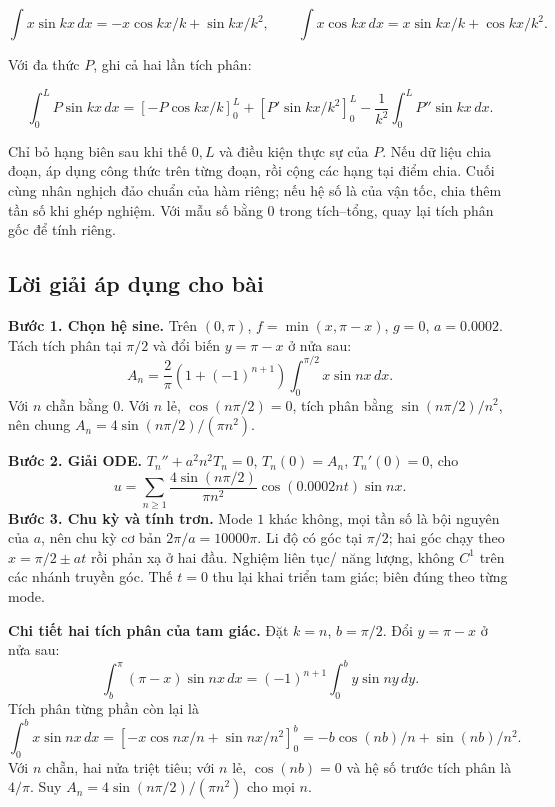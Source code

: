 \documentclass[10pt,a4paper]{article}
\begin{document}
\[
\int x\sin kx\,dx=-x\cos kx/k+\sin kx/k^2,\qquad
\int x\cos kx\,dx=x\sin kx/k+\cos kx/k^2.
\]


Với đa thức $P$, ghi cả hai lần tích phân:


\[
\int_0^L P\sin kx\,dx
=\left[-P\cos kx/k\right]_0^L+
\left[P'\sin kx/k^2\right]_0^L-
\frac1{k^2}\int_0^L P''\sin kx\,dx.
\]


Chỉ bỏ hạng biên sau khi thế $0,L$ và điều kiện thực sự của $P$. Nếu dữ liệu chia đoạn, áp dụng công thức trên từng đoạn, rồi cộng các hạng tại điểm chia. Cuối cùng nhân nghịch đảo chuẩn của hàm riêng; nếu hệ số là của vận tốc, chia thêm tần số khi ghép nghiệm. Với mẫu số bằng $0$ trong tích–tổng, quay lại tích phân gốc để tính riêng.
\subsection*{Lời giải áp dụng cho bài}
\textbf{Bước 1. Chọn hệ sine.} Trên $(0,\pi)$, $f=\min(x,\pi-x)$, $g=0$, $a=0.0002$. Tách tích phân tại $\pi/2$ và đổi biến $y=\pi-x$ ở nửa sau:
\[A_n=\frac2\pi(1+(-1)^{n+1})\int_0^{\pi/2}x\sin nx\,dx.\]
Với $n$ chẵn bằng $0$. Với $n$ lẻ, $\cos(n\pi/2)=0$, tích phân bằng $\sin(n\pi/2)/n^2$, nên chung $A_n=4\sin(n\pi/2)/(\pi n^2)$.

\textbf{Bước 2. Giải ODE.} $T_n''+a^2n^2T_n=0$, $T_n(0)=A_n$, $T_n'(0)=0$, cho
\[u=\sum_{n\ge1}\frac{4\sin(n\pi/2)}{\pi n^2}\cos(0.0002nt)\sin nx.\]
\textbf{Bước 3. Chu kỳ và tính trơn.} Mode $1$ khác không, mọi tần số là bội nguyên của $a$, nên chu kỳ cơ bản $2\pi/a=10000\pi$. Li độ có góc tại $\pi/2$; hai góc chạy theo $x=\pi/2\pm at$ rồi phản xạ ở hai đầu. Nghiệm liên tục/ năng lượng, không $C^1$ trên các nhánh truyền góc. Thế $t=0$ thu lại khai triển tam giác; biên đúng theo từng mode.

\textbf{Chi tiết hai tích phân của tam giác.} Đặt $k=n$, $b=\pi/2$. Đổi $y=\pi-x$ ở nửa sau:
\[\int_b^\pi(\pi-x)\sin nx\,dx=(-1)^{n+1}\int_0^b y\sin ny\,dy.\]
Tích phân từng phần còn lại là
\[\int_0^b x\sin nx\,dx=\left[-x\cos nx/n+\sin nx/n^2\right]_0^b
=-b\cos(nb)/n+\sin(nb)/n^2.\]
Với $n$ chẵn, hai nửa triệt tiêu; với $n$ lẻ, $\cos(nb)=0$ và hệ số trước tích phân là $4/\pi$. Suy $A_n=4\sin(n\pi/2)/(\pi n^2)$ cho mọi $n$.
\end{document}
